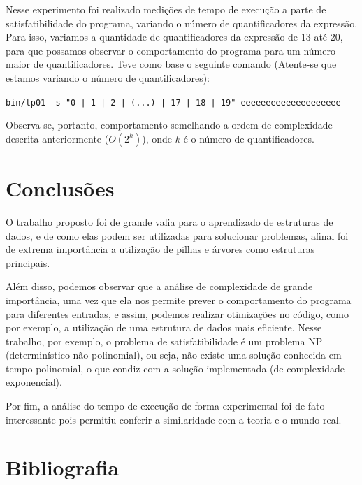 \documentclass{article}
\begin{document}
            Nesse experimento foi realizado medições de tempo de execução a parte de satisfatibilidade do programa, variando o número de quantificadores da expressão. Para isso,
            variamos a quantidade de quantificadores da expressão de 13 até 20, para que possamos observar o comportamento do programa para um número maior de quantificadores.
            Teve como base o seguinte comando (Atente-se que estamos variando o número de quantificadores): 


\verb#bin/tp01 -s "0 | 1 | 2 | (...) | 17 | 18 | 19" eeeeeeeeeeeeeeeeeeee#

    

Observa-se, portanto, comportamento semelhando a ordem de complexidade descrita anteriormente ($O(2^k)$), onde $k$ é o número de quantificadores.

\section{Conclusões}

O trabalho proposto foi de grande valia para o aprendizado de estruturas de dados, e de como elas podem ser utilizadas para solucionar problemas, afinal foi de extrema importância a utilização de pilhas e árvores como estruturas principais.  

Além disso, podemos observar que a análise de complexidade de grande importância, uma vez que ela nos permite prever o comportamento do programa para diferentes entradas, e assim, podemos realizar otimizações no código, como por exemplo, a utilização de uma estrutura de dados mais eficiente. Nesse trabalho, por exemplo, o problema de satisfatibilidade é um problema NP (determinístico não polinomial), ou seja, não existe uma solução conhecida em tempo polinomial, o que condiz com a solução implementada (de complexidade exponencial).

Por fim, a análise do tempo de execução de forma experimental foi de fato interessante pois permitiu conferir a similaridade com a teoria e o mundo real.
\section*{Bibliografia}
\end{document}
